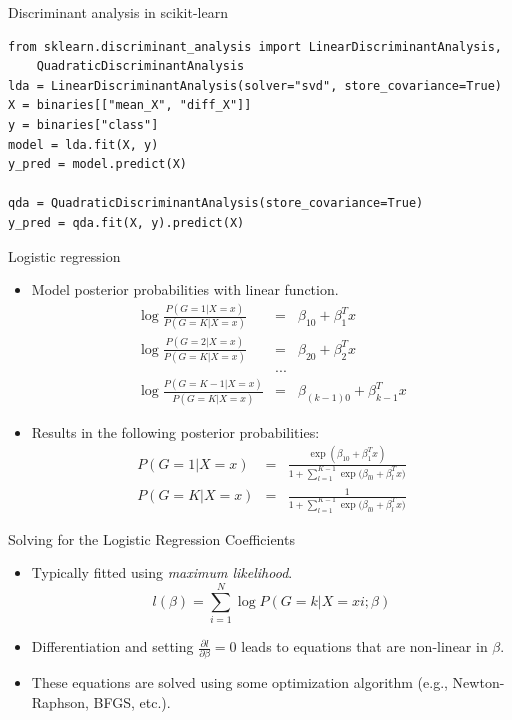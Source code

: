 \documentclass[aspectratio=169]{beamer}
\begin{document}
\begin{frame}[fragile]{Discriminant analysis in scikit-learn}
\begin{verbatim}
from sklearn.discriminant_analysis import LinearDiscriminantAnalysis,
    QuadraticDiscriminantAnalysis
lda = LinearDiscriminantAnalysis(solver="svd", store_covariance=True)
X = binaries[["mean_X", "diff_X"]]
y = binaries["class"]
model = lda.fit(X, y)
y_pred = model.predict(X)

qda = QuadraticDiscriminantAnalysis(store_covariance=True)
y_pred = qda.fit(X, y).predict(X)
\end{verbatim}
\end{frame} 


\begin{frame}{Logistic regression}
    \begin{itemize}
        \item Model posterior probabilities with linear function.
        \begin{eqnarray*}
            \log{\frac{P(G=1|X=x)}{P(G=K|X=x)}} & = & \beta_{10} + \beta_1^T x\\
            \log{\frac{P(G=2|X=x)}{P(G=K|X=x)}} & = & \beta_{20} + \beta_2^T x\\
            & ... &\\
            \log{\frac{P(G=K-1|X=x)}{P(G=K|X=x)}} & = & \beta_{(k-1)0} + \beta_{k-1}^T x
        \end{eqnarray*}
        \item Results in the following posterior probabilities:
        \begin{eqnarray*}
            P(G=1|X=x) & = & \frac{\exp{(\beta_{10} + \beta_1^T x)}}{1 + \sum_{l=1}^{K-1}\exp{(\beta_{l0} + \beta_l^T x})}\\
            P(G=K|X=x) & = & \frac{1}{1 + \sum_{l=1}^{K-1}\exp{(\beta_{l0} + \beta_l^T x})}
        \end{eqnarray*}
    \end{itemize}
\end{frame} 


\begin{frame}{Solving for the Logistic Regression Coefficients}
    \begin{itemize}
        \item Typically fitted using \textit{maximum likelihood}.
        \begin{equation*}
            l(\beta) = \sum_{i=1}^N \log {P(G = k | X = x i; \beta)}
        \end{equation*}
        \item Differentiation and setting $\frac{\partial{l}}{\partial{\beta}} = 0$ leads to equations that are non-linear in $\beta$.
        \item These equations are solved using some optimization algorithm (e.g., Newton-Raphson, BFGS, etc.). 
    \end{itemize}
\end{frame} 
\end{document}
